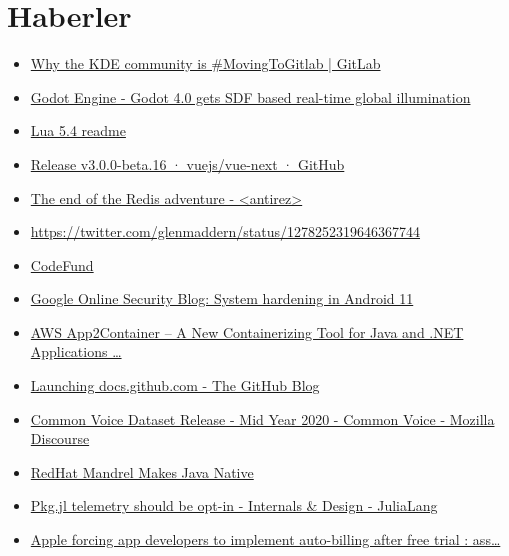 \documentclass[11pt]{article}
\begin{document}
\section*{Haberler}
\label{sec:orgd88165d}
\begin{itemize}
\item \href{https://about.gitlab.com/blog/2020/06/29/welcome-kde/}{Why the KDE community is \#MovingToGitlab | GitLab}
\item \href{https://godotengine.org/article/godot-40-gets-sdf-based-real-time-global-illumination}{Godot Engine - Godot 4.0 gets SDF based real-time global illumination}
\item \href{http://www.lua.org/manual/5.4/readme.html\#changes}{Lua 5.4 readme}
\item \href{https://github.com/vuejs/vue-next/releases/tag/v3.0.0-beta.16}{Release v3.0.0-beta.16 · vuejs/vue-next · GitHub}
\item \href{http://antirez.com/news/133}{The end of the Redis adventure - <antirez>}
\item \url{https://twitter.com/glenmaddern/status/1278252319646367744}
\item \href{https://codefund.io/}{CodeFund}
\item \href{https://security.googleblog.com/2020/06/system-hardening-in-android-11.html}{Google Online Security Blog: System hardening in Android 11}
\item \href{https://aws.amazon.com/tr/blogs/aws/aws-app2container-a-new-containerizing-tool-for-java-and-asp-net-applications/}{AWS App2Container – A New Containerizing Tool for Java and .NET Applications \ldots{}}
\item \href{https://github.blog/2020-07-01-launching-docs-github-com/}{Launching docs.github.com - The GitHub Blog}
\item \href{https://discourse.mozilla.org/t/common-voice-dataset-release-mid-year-2020/62938}{Common Voice Dataset Release - Mid Year 2020 - Common Voice - Mozilla Discourse}
\item \href{https://www.infoq.com/news/2020/07/mandrel-graalvm/}{RedHat Mandrel Makes Java Native}
\item \href{https://discourse.julialang.org/t/pkg-jl-telemetry-should-be-opt-in/42209}{Pkg.jl telemetry should be opt-in - Internals \& Design - JuliaLang}
\item \href{https://old.reddit.com/r/assholedesign/comments/hj57fv/apple\_forcing\_app\_developers\_to\_implement/}{Apple forcing app developers to implement auto-billing after free trial : ass\ldots{}}

\end{itemize}
\end{document}
